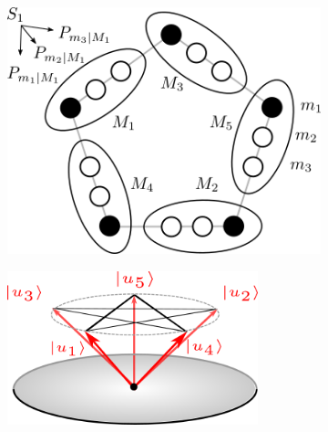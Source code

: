\begin{figure}
	\begin{subfigure}[t]{0.45\textwidth}
    	\centering
    	\includegraphics[width=\textwidth]{images/mntsandpreps.png}
        \caption{}
	\end{subfigure}
	\hfill
    \begin{subfigure}[t]{0.45\textwidth}
    	\centering 
        \includegraphics[width=0.8\textwidth]{images/kcbsrefstates.png}
        \caption{}
    \end{subfigure}
    \caption{}
\end{figure}

